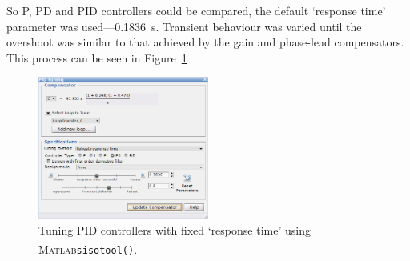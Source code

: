 \documentclass[a4paper,10pt,twocolumn]{article}
\newcommand{\Matlab}{\textsc{Matlab}\textsuperscript{\textregistered}\xspace}
\newcommand{\sisotool}{\texttt{sisotool()}\xspace}
\begin{document}
So P, PD and PID controllers could be compared, the default `response time' parameter was used---\SI{0.1836}{\second}. Transient behaviour was varied until the overshoot was similar to that achieved by the gain and phase-lead compensators. This process can be seen in Figure~\ref{fig:pid_tune2}

\begin{figure}[h!]
	\centering
	\includegraphics[width=0.5\textwidth]{img/pid_tune2.png}
	\caption{Tuning PID controllers with fixed `response time' using \Matlab \sisotool.}
	\label{fig:pid_tune2}
\end{figure}
\end{document}
